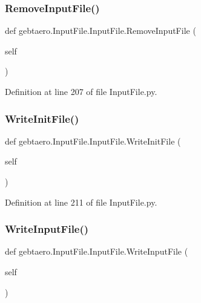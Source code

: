 \subsubsection{\texorpdfstring{Remove\+Input\+File()}{RemoveInputFile()}}
{\footnotesize\ttfamily def gebtaero.\+Input\+File.\+Input\+File.\+Remove\+Input\+File (\begin{DoxyParamCaption}\item[{}]{self }\end{DoxyParamCaption})}



Definition at line 207 of file Input\+File.\+py.

\mbox{\label{classgebtaero_1_1_input_file_1_1_input_file_a0138cdf368f06be59a355955c737a3c3}} 
\subsubsection{\texorpdfstring{Write\+Init\+File()}{WriteInitFile()}}
{\footnotesize\ttfamily def gebtaero.\+Input\+File.\+Input\+File.\+Write\+Init\+File (\begin{DoxyParamCaption}\item[{}]{self }\end{DoxyParamCaption})}



Definition at line 211 of file Input\+File.\+py.

\mbox{\label{classgebtaero_1_1_input_file_1_1_input_file_aff90830e65ba0e25b330c595a94a7a82}} 
\subsubsection{\texorpdfstring{Write\+Input\+File()}{WriteInputFile()}}
{\footnotesize\ttfamily def gebtaero.\+Input\+File.\+Input\+File.\+Write\+Input\+File (\begin{DoxyParamCaption}\item[{}]{self }\end{DoxyParamCaption})}

